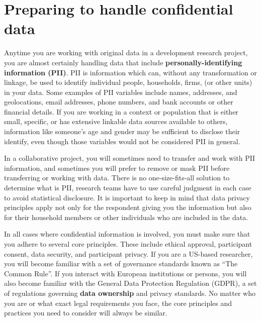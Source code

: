 
\section{Preparing to handle confidential data}

Anytime you are working with original data in a development research project,
you are almost certainly handling data that include
\textbf{personally-identifying	information (PII)}.
PII is information which can, without any transformation or linkage,
be used to identify individual people, households, firms,
(or other units) in your data.
Some examples of PII variables include names, addresses, and geolocations,
email addresses, phone numbers,
and bank accounts or other financial details.
If you are working in a context or population that is either small, specific,
or has extensive linkable data sources available to others,
information like someone's age and gender may be sufficient to
disclose their identify, even though those variables would not be considered PII in general.

In a collaborative project, 
you will sometimes need to transfer and work with PII information,
and sometimes you will prefer to remove or mask PII
before transferring or working with data.
There is no one-size-fits-all solution to determine what is PII,
research teams have to use careful judgment in each case to avoid statistical disclosure.
It is important to keep in mind that data privacy principles apply
not only for the respondent giving you the information
but also for their household members or other individuals who are included in the data.

In all cases where confidential information is involved,
you must make sure that you adhere to several core principles.
These include ethical approval, participant consent,
data security, and participant privacy.
If you are a US-based researcher, you will become familiar
with a set of governance standards known as ``The Common Rule''.\cite{bierer2017revised}
If you interact with European institutions or persons,
you will also become familiar with the General Data Protection Regulation (GDPR),
a set of regulations governing \textbf{data ownership} and privacy standards.
No matter who you are or what exact legal requirements you face,
the core principles and practices you need to consider will always be similar.

